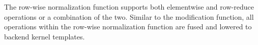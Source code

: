 The row-wise normalization function supports both elementwise and row-reduce operations or a combination of the two. Similar to the modification function, all operations within the row-wise normalization function are fused and lowered to backend kernel templates.




    
